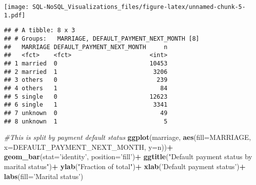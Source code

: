 \documentclass[]{article}
\newenvironment{Shaded}{\begin{snugshade}}{\end{snugshade}}
\newcommand{\KeywordTok}[1]{\textcolor[rgb]{0.13,0.29,0.53}{\textbf{#1}}}
\newcommand{\DataTypeTok}[1]{\textcolor[rgb]{0.13,0.29,0.53}{#1}}
\newcommand{\DecValTok}[1]{\textcolor[rgb]{0.00,0.00,0.81}{#1}}
\newcommand{\StringTok}[1]{\textcolor[rgb]{0.31,0.60,0.02}{#1}}
\newcommand{\CommentTok}[1]{\textcolor[rgb]{0.56,0.35,0.01}{\textit{#1}}}
\newcommand{\OperatorTok}[1]{\textcolor[rgb]{0.81,0.36,0.00}{\textbf{#1}}}
\newcommand{\NormalTok}[1]{#1}
\begin{document}
\texttt{[image: SQL-NoSQL\_Visualizations\_files/figure-latex/unnamed-chunk-5-1.pdf]}

\begin{Shaded}
\end{Shaded}

\begin{verbatim}
## # A tibble: 8 x 3
## # Groups:   MARRIAGE, DEFAULT_PAYMENT_NEXT_MONTH [8]
##   MARRIAGE DEFAULT_PAYMENT_NEXT_MONTH     n
##   <fct>    <fct>                      <int>
## 1 married  0                          10453
## 2 married  1                           3206
## 3 others   0                            239
## 4 others   1                             84
## 5 single   0                          12623
## 6 single   1                           3341
## 7 unknown  0                             49
## 8 unknown  1                              5
\end{verbatim}

\begin{Shaded}
\begin{Highlighting}[]
\CommentTok{#This is split by payment default status}
\KeywordTok{ggplot}\NormalTok{(marriage, }\KeywordTok{aes}\NormalTok{(}\DataTypeTok{fill=}\NormalTok{MARRIAGE, }\DataTypeTok{x=}\NormalTok{DEFAULT_PAYMENT_NEXT_MONTH, }\DataTypeTok{y=}\NormalTok{n))}\OperatorTok{+}
\StringTok{  }\KeywordTok{geom_bar}\NormalTok{(}\DataTypeTok{stat=}\StringTok{'identity'}\NormalTok{, }\DataTypeTok{position=}\StringTok{'fill'}\NormalTok{)}\OperatorTok{+}
\StringTok{  }\KeywordTok{ggtitle}\NormalTok{(}\StringTok{"Default payment status by marital status"}\NormalTok{)}\OperatorTok{+}
\StringTok{  }\KeywordTok{ylab}\NormalTok{(}\StringTok{"Fraction of total"}\NormalTok{)}\OperatorTok{+}
\StringTok{  }\KeywordTok{xlab}\NormalTok{(}\StringTok{'Default payment status'}\NormalTok{)}\OperatorTok{+}
\StringTok{  }\KeywordTok{labs}\NormalTok{(}\DataTypeTok{fill=}\StringTok{'Marital status'}\NormalTok{)}
\end{Highlighting}
\end{Shaded}
\end{document}
